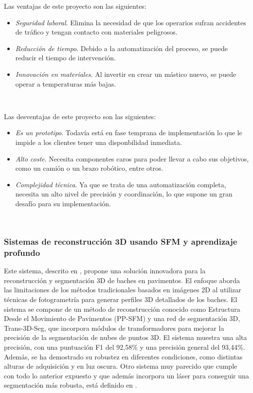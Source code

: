 Las ventajas de este proyecto son las siguientes:

\begin{itemize}
	\item \textit{Seguridad laboral}. Elimina la necesidad de que los operarios sufran accidentes de tráfico y tengan contacto con materiales peligrosos.
	\item \textit{Reducción de tiempo}. Debido a la automatización del proceso, se puede reducir el tiempo de intervención.
	\item \textit{Innovación en materiales}. Al invertir en crear un mástico nuevo, se puede operar a temperaturas más bajas.
\end{itemize}\


Las desventajas de este proyecto son las siguientes:

\begin{itemize}
	\item \textit{Es un prototipo}. Todavía está en fase temprana de implementación lo que le impide a los clientes tener una disponbilidad inmediata.
	\item \textit{Alto coste}. Necesita componentes caros para poder llevar a cabo sus objetivos, como un camión o un brazo robótico, entre otros.
	\item \textit{Complejidad técnica}. Ya que se trata de una automatización completa, necesita un alto nivel de precisión y coordinación, lo que supone un gran desafío para su implementación.
\end{itemize}\

\subsubsection{Sistemas de reconstrucción 3D usando SFM y aprendizaje profundo}
\label{subsubsec:sistema5}

Este sistema, descrito en \cite{WANG2023132499}, propone una solución innovadora para la reconstrucción y segmentación 3D de baches en pavimentos. El enfoque aborda las limitaciones de los métodos tradicionales basados en imágenes 2D al utilizar técnicas de fotogrametría para generar perfiles 3D detallados de los baches. El sistema se compone de un método de reconstrucción conocido como Estructura Desde el Movimiento de Pavimentos (PP-SFM) y una red de segmentación 3D, Trans-3D-Seg, que incorpora módulos de transformadores para mejorar la precisión de la segmentación de nubes de puntos 3D. El sistema muestra una alta precisión, con una puntuación F1 del 92,58\% y una precisión general del 93,44\%. Además, se ha demostrado su robustez en diferentes condiciones, como distintas alturas de adquisición y en luz oscura. Otro sistema muy parecido que cumple con todo lo anterior expuesto y que además incorpora un láser para conseguir una segmentación más robusta, está definido en \cite{9345528}.

